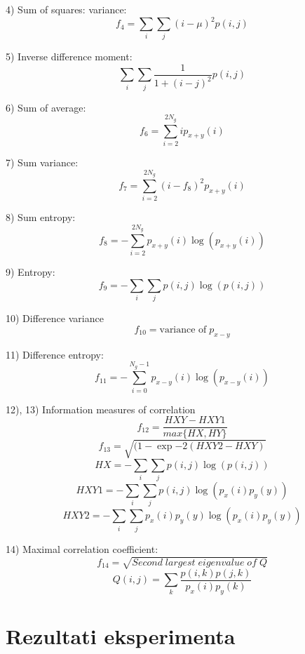 \documentclass[times, utf8, zavrsni]{fer}
\begin{document}
4) Sum of squares: variance:
\[
f_4 = \sum_i\sum_j(i-\mu)^2p(i,j)
\]

5) Inverse difference moment:
\[
\sum_i\sum_j \frac{1}{1+(i-j)^2}p(i,j)
\]

6) Sum of average:
\[
f_6 = \sum_{i=2}^{2N_g}ip_{x+y}(i)
\]

7) Sum variance:
\[
f_7 = \sum_{i=2}^{2N_g}(i-f_8)^2p_{x+y}(i)
\]

8) Sum entropy:
\[
f_8 = -\sum_{i=2}^{2N_g}p_{x+y}(i)\log(p_{x+y}(i))
\]

9) Entropy:
\[
f_9 = -\sum_i\sum_j p(i,j)\log(p(i,j))
\]

10) Difference variance
\[
f_{10} = \textrm{variance of} \; p_{x-y}
\]

11) Difference entropy:
\[
f_{11} = -\sum_{i=0}^{N_g-1}p_{x-y}(i)\log(p_{x-y}(i)) 
\]

12), 13) Information measures of correlation
\[
f_{12} = \frac{HXY - HXY1}{max\{HX,HY\}}
\]
\[
f_{13} = \sqrt{(1-\exp{-2(HXY2 - HXY)}}
\]
\[
HX = -\sum_i\sum_j p(i,j)\log(p(i,j))
\]
\[
HXY1 = -\sum_i\sum_j p(i,j)\log(p_x(i)p_y(y))
\]
\[
HXY2 = -\sum_i\sum_j p_x(i)p_y(y) \log(p_x(i)p_y(y))
\]

14) Maximal correlation coefficient:
\[
f_{14} = \sqrt{Second \; largest \; eigenvalue \; of \; Q}
\]
\[
Q(i,j) = \sum_k \frac{p(i,k)p(j,k)}{p_x(i)p_y(k)}
\]

\chapter{Rezultati eksperimenta}
\end{document}
